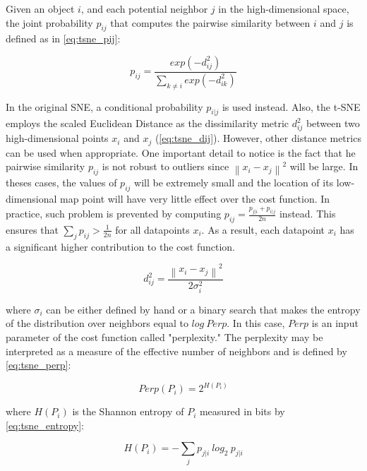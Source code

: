 Given an object $i$, and each potential neighbor $j$ in the high-dimensional space, the joint probability $p_{ij}$ that computes the pairwise similarity between $i$ and $j$ is defined as in \autoref{eq:tsne_pij}:

\begin{equation}
\label{eq:tsne_pij}
p_{ij} = \frac{exp(-d_{ij}^2)}{\sum_{k \neq i}exp(-d_{ik}^2)}
\end{equation}

In the original SNE, a conditional probability $p_{i|j}$ is used instead. Also, the t-SNE employs the scaled Euclidean Distance as the dissimilarity metric $d_{ij}^2$ between two high-dimensional points $x_i$ and $x_j$ (\autoref{eq:tsne_dij}). However, other distance metrics can be used when appropriate. One important detail to notice is the fact that he pairwise similarity $p_{ij}$ is not robust to outliers since $\left\| x_i - x_j\right\|^2$ will be large. In theses cases, the values of $p_{ij}$ will be extremely small and the location of its low-dimensional map point will have very little effect over the cost function. In practice, such problem is prevented by computing $p_{ij} = \frac{p_{j|i} + p_{i|j}}{2n}$ instead. This ensures that $\sum_j p_{ij} > \frac{1}{2n}$ for all datapoints $x_i$. As a result, each datapoint $x_i$ has a significant higher contribution to the cost function.

\begin{equation}
\label{eq:tsne_dij}
d_{ij}^2 = \frac{\left\| x_i - x_j \right\|^2}{2\sigma_i^2}
\end{equation}

\noindent
where $\sigma_i$ can be either defined by hand or a binary search that makes the entropy of the distribution over neighbors equal to $log\ Perp$. In this case, $Perp$ is an input parameter of the cost function called "perplexity." The perplexity may be interpreted as a measure of the effective number of neighbors and is defined by \autoref{eq:tsne_perp}:

\begin{equation}
\label{eq:tsne_perp}
Perp(P_i) = 2^{H(P_i)}
\end{equation}

\noindent
where $H(P_i)$ is the Shannon entropy of $P_i$ measured in bits by \autoref{eq:tsne_entropy}:

\begin{equation}
\label{eq:tsne_entropy}
H(P_i) = -\sum_j p_{j|i}\ log_2\ p_{j|i}
\end{equation}

